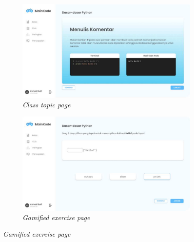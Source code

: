 \newpage
\begin{figure}[htbp]
	\centering
	\begin{subfigure}[b]{0.4\textwidth}
		\centering
	  \includegraphics[width=\linewidth]{contents/chapter-2/images/Evan-a1.png}
	  \caption{\textit{Class topic page}}
	  \label{fig:sub1-a1}
	\end{subfigure}
	\begin{subfigure}[b]{0.4\textwidth}
	\centering
	  \includegraphics[width=\linewidth]{contents/chapter-2/images/Evan-a2.png}
	  \caption{\textit{Gamified exercise page}}

\end{subfigure}
\end{figure}

